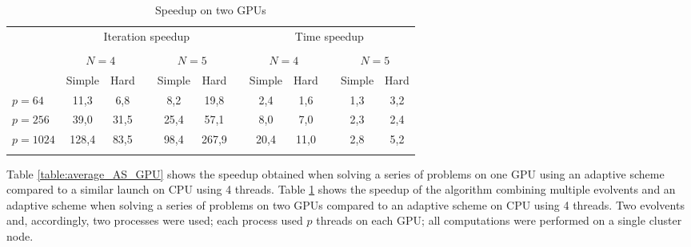 \documentclass{svproc}
\begin{document}
\begin{table}[t]
                \caption{Speedup on two GPUs}
                \label{table:average_MMAS_GPU}
                \center
                \begin{tabular}{lccccccccccc}
                & \multicolumn{5}{c}{ Iteration speedup} & & \multicolumn{5}{c}{ Time speedup}\\
                               \noalign{\smallskip} \cline{2-6} \cline{8-12}  \\
                               & \multicolumn{2}{c}{ $N=4$ } & & \multicolumn{2}{c}{$N=5$} &  & \multicolumn{2}{c}{ $N=4$ } & & \multicolumn{2}{c}{$N=5$} \\
                               \noalign{\smallskip} \cline{2-3} \cline{5-6}  \cline{8-9} \cline{11-12} \noalign{\smallskip}
                               & Simple & Hard & & Simple & Hard &  & Simple & Hard & & Simple & Hard  \\
                               \noalign{\smallskip} \hline \noalign{\smallskip}                               
                               $p=64$  &    11,3	 & 6,8	 &   & 8,2	 & 19,8  &   & 2,4	 & 1,6	 &   & 1,3	 & 3,2 \\
                               $p=256$ &    39,0	 & 31,5 &   & 25,4	 & 57,1  &   & 8,0	 & 7,0	 &   & 2,3	 & 2,4 \\
							   $p=1024$&    128,4	 & 83,5 &   & 98,4	 & 267,9 &   & 20,4  & 11,0  &   & 2,8	 & 5,2 \\
                               \noalign{\smallskip}\hline
                \end{tabular}
\end{table}


Table \ref{table:average_AS_GPU} shows the speedup obtained when solving a series of problems on one GPU using an adaptive scheme compared to a similar launch on CPU using 4 threads. Table \ref{table:average_MMAS_GPU} shows the speedup of the algorithm combining multiple evolvents and an adaptive scheme when solving a series of problems on two GPUs compared to an adaptive scheme on CPU using 4 threads. Two evolvents and, accordingly, two processes were used; each process used $p$ threads on each GPU; all computations were performed on a single cluster node.
\end{document}
